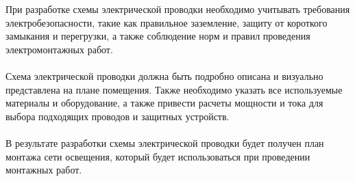 \documentclass{article}
\begin{document}
При разработке схемы электрической проводки необходимо учитывать требования электробезопасности, такие как правильное заземление, защиту от короткого замыкания и перегрузки, а также соблюдение норм и правил проведения электромонтажных работ.\\
~\\
Схема электрической проводки должна быть подробно описана и визуально представлена на плане помещения. Также необходимо указать все используемые материалы и оборудование, а также привести расчеты мощности и тока для выбора подходящих проводов и защитных устройств.\\
~\\
В результате разработки схемы электрической проводки будет получен план монтажа сети освещения, который будет использоваться при проведении монтажных работ.\\
~\\

\newpage
\end{document}
